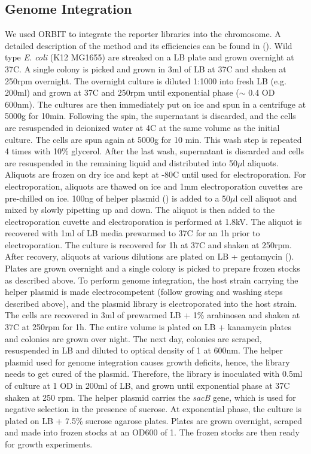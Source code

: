 \subsection{Genome Integration}
\label{sec:genome_int}
We used ORBIT to integrate the reporter libraries into the chromosome. A detailed description of the method and its efficiencies can be found in (). Wild type \textit{E. coli} (K12 MG1655) are streaked on a LB plate and grown overnight at 37C. A single colony is picked and grown in 3ml of LB at 37C and shaken at 250rpm overnight. The overnight culture is diluted 1:1000 into fresh LB (e.g. 200ml) and grown at 37C and 250rpm until exponential phase ($\sim$ 0.4 OD 600nm). The cultures are then immediately put on ice and spun in a centrifuge at 5000g for 10min. Following the spin, the supernatant is discarded, and the cells are resuspended in deionized water at 4C at the same volume as the initial culture. The cells are spun again at 5000g for 10 min. This wash step is repeated 4 times with 10\% glycerol. After the last wash, supernatant is discarded and cells are resuspended in the remaining liquid and distributed into 50$\mu$l aliquots. Aliquots are frozen on dry ice and kept at -80C until used for electroporation. For electroporation, aliquots are thawed on ice and 1mm electroporation cuvettes are pre-chilled on ice. 100ng of helper plasmid () is added to a 50$\mu$l cell aliquot and mixed by slowly pipetting up and down. The aliquot is then added to the electroporation cuvette and electroporation is performed at 1.8kV. The aliquot is recovered with 1ml of LB media prewarmed to 37C for an 1h prior to electroporation. The culture is recovered for 1h at 37C and shaken at 250rpm. After recovery, aliquots at various dilutions are plated on LB + gentamycin (). Plates are grown overnight and a single colony is picked to prepare frozen stocks as described above. To perform genome integration, the host strain carrying the helper plasmid is made electrocompetent (follow growing and washing steps described above), and the plasmid library is electroporated into the host strain. The cells are recovered in 3ml of prewarmed LB + 1\% arabinosea and shaken at 37C at 250rpm for 1h. The entire volume is plated on LB + kanamycin plates  and colonies are grown over night. The next day, colonies are scraped, resuspended in LB and diluted to optical density of 1 at 600nm. The helper plasmid used for genome integration causes growth deficits, hence, the library needs to get cured of the plasmid. Therefore, the library is inoculated with 0.5ml of culture at 1 OD in 200ml of LB, and grown until exponential phase at 37C shaken at 250 rpm. The helper plasmid carries the \textit{sacB} gene, which is used for negative selection in the presence of sucrose. At exponential phase, the culture is plated on LB + 7.5\% sucrose agarose plates. Plates are grown overnight, scraped and made into frozen stocks at an OD600 of 1. The frozen stocks are then ready for growth experiments.


